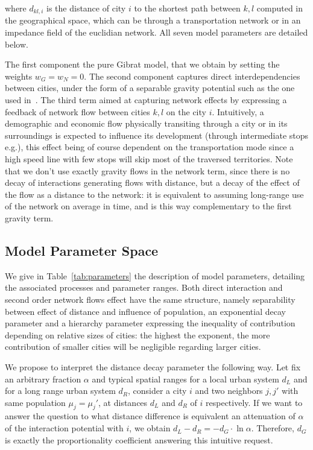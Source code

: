 \documentclass[Royal,sageh,times]{sagej}
\begin{document}
where $d_{kl,i}$ is the distance of city $i$ to the shortest path between $k,l$ computed in the geographical space, which can be through a transportation network or in an impedance field of the euclidian network. All seven model parameters are detailed below.


The first component  the pure Gibrat model, that we obtain by setting the weights $w_G = w_N = 0$. The second component captures direct interdependencies between cities, under the form of a separable gravity potential such as the one used in~\cite{sanders1992systeme}. The third term  aimed at capturing network effects by expressing a feedback of network flow between cities $k,l$ on the city $i$. Intuitively, a demographic and economic flow physically transiting through a city or in its surroundings is expected to influence its development (through intermediate stops e.g.), this effect being of course dependent on the transportation mode since a high speed line with few stops will skip most of the traversed territories. Note that we don't use exactly gravity flows in the network term, since there is no decay of interactions generating flows with distance, but a decay of the effect of the flow as a distance to the network: it is equivalent to assuming  long-range use of the network on average in time, and is this way complementary to the first gravity term.


\subsection*{Model Parameter Space}

We give in Table~\ref{tab:parameters} the description of model parameters, detailing the associated processes and parameter ranges. Both direct interaction and second order network flows effect have the same structure, namely separability between  effect of distance and  influence of population, an exponential decay parameter and a hierarchy parameter expressing the inequality of contribution depending on relative sizes of cities: the highest the exponent, the more contribution of smaller cities will be negligible regarding larger cities.

We propose to interpret the distance decay parameter the following way. Let fix an arbitrary fraction $\alpha$ and typical spatial ranges for a local urban system $d_L$ and for a long range urban system $d_R$, consider a city $i$ and two neighbors $j,j'$ with same population $\mu_j=\mu_j'$, at distances $d_L$ and $d_R$ of $i$ respectively. If we want to answer the question to what distance difference is equivalent an attenuation of $\alpha$ of the interaction potential with $i$, we obtain $d_L - d_R = -d_G\cdot \ln \alpha$. Therefore, $d_G$ is exactly the proportionality coefficient answering this intuitive request.
\end{document}
